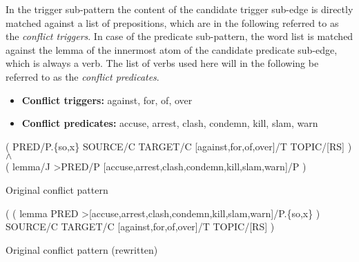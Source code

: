\documentclass[11pt, numbers=noenddot]{scrreprt}
\begin{document}
In the trigger sub-pattern the content of the candidate trigger sub-edge is directly matched against a list of prepositions, which are in the following referred to as the \textit{conflict triggers}. In case of the predicate sub-pattern, the word list is matched against the lemma of the innermost atom of the candidate predicate sub-edge, which is always a verb. The list of verbs used here will in the following be referred to as the \textit{conflict predicates}.

\begin{itemize}
	\item \textbf{\textsf{Conflict triggers:}} against, for, of, over
	\item \textbf{\textsf{Conflict predicates:}} accuse, arrest, clash, condemn, kill, slam, warn
\end{itemize}


\begin{pattern}
  \normalfont\sffamily
  \centering
  ( PRED/P.\{so,x\} SOURCE/C TARGET/C [against,for,of,over]/T TOPIC/[RS] ) \(\wedge\) \\
  ( lemma/J >PRED/P [accuse,arrest,clash,condemn,kill,slam,warn]/P )
  \caption{Original conflict pattern}
  \label{pat:original-conflict-realog}
\end{pattern}

\begin{pattern}
  \normalfont\sffamily
  \centering
  ( ( lemma PRED >[accuse,arrest,clash,condemn,kill,slam,warn]/P.\{so,x\} ) \\
  SOURCE/C TARGET/C [against,for,of,over]/T TOPIC/[RS] ) 

  \caption{Original conflict pattern (rewritten)}
  \label{pat:original-conflict}
\end{pattern}



\end{document}
